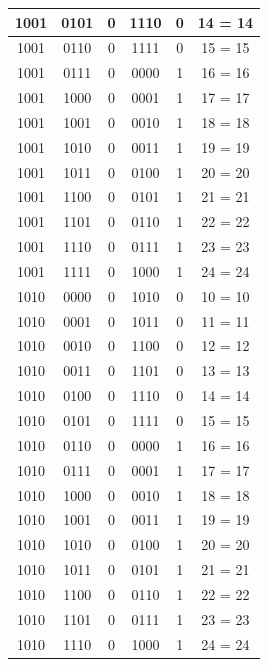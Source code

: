 \documentclass{exam}
\begin{document}
\begin{center}
\begin{longtable}{|c|c|c|c|c|c|}
                1001 & 0101 & 0 & 1110 & 0 & 14 = 14 \\ \hline
                1001 & 0110 & 0 & 1111 & 0 & 15 = 15 \\ \hline
                1001 & 0111 & 0 & 0000 & 1 & 16 = 16 \\ \hline
                1001 & 1000 & 0 & 0001 & 1 & 17 = 17 \\ \hline
                1001 & 1001 & 0 & 0010 & 1 & 18 = 18 \\ \hline
                1001 & 1010 & 0 & 0011 & 1 & 19 = 19 \\ \hline
                1001 & 1011 & 0 & 0100 & 1 & 20 = 20 \\ \hline
                1001 & 1100 & 0 & 0101 & 1 & 21 = 21 \\ \hline
                1001 & 1101 & 0 & 0110 & 1 & 22 = 22 \\ \hline
                1001 & 1110 & 0 & 0111 & 1 & 23 = 23 \\ \hline
                1001 & 1111 & 0 & 1000 & 1 & 24 = 24 \\ \hline
                1010 & 0000 & 0 & 1010 & 0 & 10 = 10 \\ \hline
                1010 & 0001 & 0 & 1011 & 0 & 11 = 11 \\ \hline
                1010 & 0010 & 0 & 1100 & 0 & 12 = 12 \\ \hline
                1010 & 0011 & 0 & 1101 & 0 & 13 = 13 \\ \hline
                1010 & 0100 & 0 & 1110 & 0 & 14 = 14 \\ \hline
                1010 & 0101 & 0 & 1111 & 0 & 15 = 15 \\ \hline
                1010 & 0110 & 0 & 0000 & 1 & 16 = 16 \\ \hline
                1010 & 0111 & 0 & 0001 & 1 & 17 = 17 \\ \hline
                1010 & 1000 & 0 & 0010 & 1 & 18 = 18 \\ \hline
                1010 & 1001 & 0 & 0011 & 1 & 19 = 19 \\ \hline
                1010 & 1010 & 0 & 0100 & 1 & 20 = 20 \\ \hline
                1010 & 1011 & 0 & 0101 & 1 & 21 = 21 \\ \hline
                1010 & 1100 & 0 & 0110 & 1 & 22 = 22 \\ \hline
                1010 & 1101 & 0 & 0111 & 1 & 23 = 23 \\ \hline
                1010 & 1110 & 0 & 1000 & 1 & 24 = 24 \\ \hline

\end{longtable}
\end{center}
\end{document}
